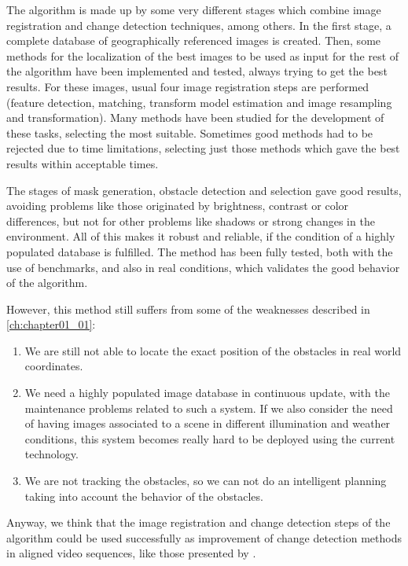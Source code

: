 The algorithm is made up by some very different stages which combine image registration and change detection techniques, among others. In the first stage, a complete database of geographically referenced images is created. Then, some methods for the localization of the best images to be used as input for the rest of the algorithm have been implemented and tested, always trying to get the best results. For these images, usual four image registration steps are performed (feature detection, matching, transform model estimation and image resampling and transformation). Many methods have been studied for the development of these tasks, selecting the most suitable. Sometimes good methods had to be rejected due to time limitations, selecting just those methods which gave the best results within acceptable times.

The stages of mask generation, obstacle detection and selection gave good results, avoiding problems like those originated by brightness, contrast or color differences, but not for other problems like shadows or strong changes in the environment. All of this makes it robust and reliable, if the condition of a highly populated database is fulfilled. The method has been fully tested, both with the use of benchmarks, and also in real conditions, which validates the good behavior of the algorithm.

However, this method still suffers from some of the weaknesses described in \ref{ch:chapter01_01}:
\begin{enumerate}
 \item We are still not able to locate the exact position of the obstacles in real world coordinates.
 \item We need a highly populated image database in continuous update, with the maintenance problems related to such a system. If we also consider the need of having images associated to a scene in different illumination and weather conditions, this system becomes really hard to be deployed using the current technology.
 \item We are not tracking the obstacles, so we can not do an intelligent planning taking into account the behavior of the obstacles. 
\end{enumerate}

Anyway, we think that the image registration and change detection steps of the algorithm could be used successfully as improvement of change detection methods in aligned video sequences, like those presented by \cite{diego2011video, evangelidis2011slice, evangelidis2011efficient}. 

